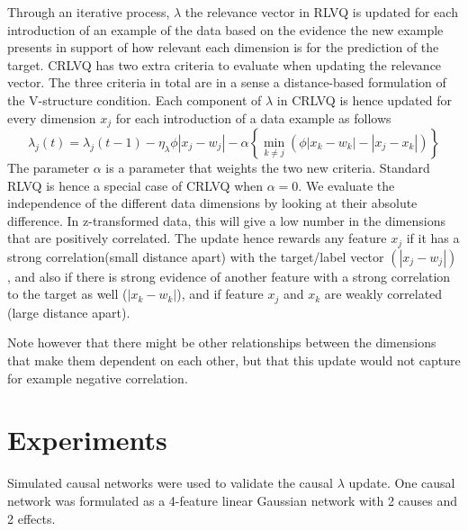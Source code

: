 \documentclass{esannV2}
\begin{document}
Through an iterative process, $\lambda$ the relevance vector in RLVQ is updated for each introduction of an example of the data based on the evidence the new example presents in support of how relevant each dimension is  for the prediction of the target. CRLVQ has two extra criteria to evaluate when updating the relevance vector. The three criteria in total are in a sense a distance-based formulation of the V-structure condition. Each component of $\lambda$ in CRLVQ is hence updated for every dimension $x_j$ for each introduction of a data example as follows
%
\begin{equation} 
\lambda_j(t) = \lambda_j(t-1) - \eta_\lambda \phi |x_j - w_j| - \alpha\left\{\min_{k \neq j}\left(\phi |x_k - w_k| - |x_j - x_k|\right)\right\} 
\end{equation}
%
The parameter $\alpha$ is a parameter that weights the two new criteria. Standard RLVQ is hence a special case of CRLVQ when $\alpha = 0$. We evaluate the independence of the different data dimensions by looking at their absolute difference. In z-transformed data, this will give a low number in the dimensions that are positively correlated. The update hence rewards any feature $x_j$ if it has a strong correlation(small distance apart) with the target/label vector $(|x_j - w_j|)$ , and also if there is strong evidence of another feature with a strong correlation to the target as well ($|x_k - w_k|$), and if feature $x_j$ and $x_k$ are weakly correlated (large distance apart).

Note however that there might be other relationships between the dimensions that make them dependent on each other, but that this update would not capture for example negative correlation. 

\section{Experiments}
\label{sec:Experiments}

Simulated causal networks were used to validate the causal $\lambda$ update. One causal network was formulated as a 4-feature linear Gaussian network with 2 causes and 2 effects. 
\end{document}
